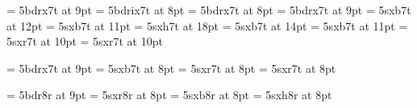 \usepackage{struktur,bodoni}
\font\ixpt      = 5bdrx7t at 9pt
\font\confname  = 5bdrix7t at 8pt
\font\crnotice  = 5bdrx7t at 8pt
\font\ninept    = 5bdrx7t at 9pt
\font\secfnt    = 5sxb7t at 12pt
\font\subsecfnt = 5sxb7t at 11pt
\font\ttlfnt    = 5sxh7t at 18pt
\font\subttlfnt = 5sxb7t at 14pt
\font\aufnt     = 5sxb7t at 11pt
\font\affaddr   = 5sxr7t at 10pt
\font\eaddfnt   = 5sxr7t at 10pt

\font\CMfont = 5bdrx7t at 9pt  %
\font\KWfont = 5sxb7t at 8pt   %
\font\VRfont = 5sxr7t at 8pt   %
\font\BGfont = 5sxr7t at 8pt   %

\font\rawcm  = 5bdr8r at 9pt  %
\font\rawrm  = 5sxr8r at 8pt  %
\font\rawbf  = 5sxb8r at 8pt
\font\rawhv  = 5sxh8r at 8pt

\def\labelitemi{\textbullet}
\def\la{{\rawrm\char'074}}
\def\ra{{\rawrm\char'076}}
\def\codeleq{{\rawrm\char'235}}
\def\codeminus{{\rawrm\char'226}}
\def\textlt{{\rawcm\char'074}}
\def\textgt{{\rawcm\char'076}}
\def\cd#1{{\BGfont#1}}
\def\id#1{\texttt{#1}}
\def\to{\ensuremath\rightarrow}


\def\Mop#1{{\color{blue}{#1}}}
\def\Mbegincode{\Mop{\rawhv.\la}\thinspace}
\def\Mendcode{\thinspace\Mop{\ra\rawhv.}}
\def\Msplice{\Mop{\rawhv.\char'176}}
\def\Mtilde{\Mop{\char'176}}

\def\Msp#1{{\color{green}{#1}}}
\def\Mquote#1{\Msp{\rawhv\char'074{\rawbf?}#1}\thinspace}
\def\Munquote{\thinspace\Msp{{\rawbf?}{\rawhv\char'076}}}

